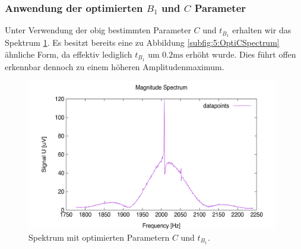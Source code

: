 \documentclass[../../main.tex]{subfiles}
\begin{document}
        \subsubsection*{Anwendung der optimierten $B_1$ und $C$ Parameter}
            Unter Verwendung der obig bestimmten Parameter $C$ und $t_{B_1}$ erhalten wir das Spektrum \ref{fig:5:OptiSpectrum}. Es besitzt bereits eine zu Abbildung \ref{subfig:5:OptiCSpectrum} ähnliche Form, da effektiv lediglich $t_{B_1}$ um $0.2\si{\milli\second}$ erhöht wurde. Dies führt offen erkennbar dennoch zu einem höheren Amplitudenmaximum.
            \begin{figure}[H]
                \centering
                \includegraphics[width=11cm]{Bilddateien/5/B1_Opti_Spectrum.png}
                \caption{Spektrum mit optimierten Parametern $C$ und $t_{B_1}$.}
                \label{fig:5:OptiSpectrum}
            \end{figure}


\end{document}
